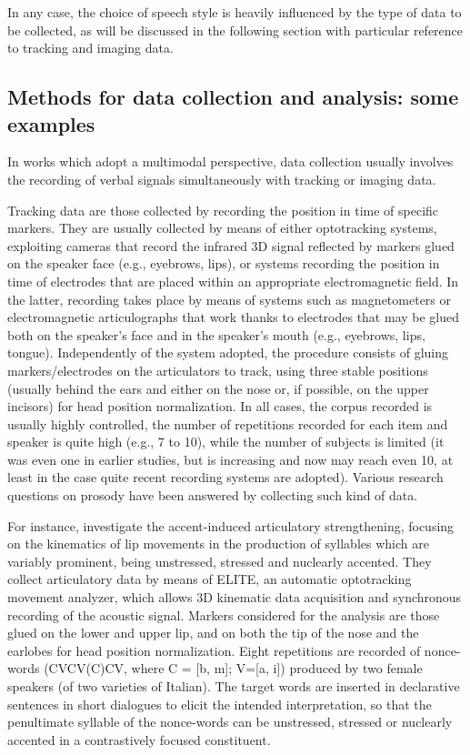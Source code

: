 \documentclass[output=paper]{langsci/langscibook}
\begin{document}
In any case, the choice of speech style is heavily influenced by the type of data to be collected, as  will be discussed in the following section with particular reference to tracking and imaging data.


 
\subsection{Methods for data collection and analysis: some examples} \label{sec:gil:2:2}


In works which adopt a multimodal perspective, data collection usually involves the recording of verbal signals simultaneously with tracking or imaging data. 

Tracking data are those collected by recording the position in time of specific markers. They are usually collected by means of either optotracking systems, exploiting cameras that record the infrared 3D signal reflected by markers glued on the speaker face (e.g., eyebrows, lips), or systems recording the position in time of electrodes that are placed within an appropriate electromagnetic field. In the latter, recording takes place by means of systems such as magnetometers or electromagnetic articulographs that work thanks to electrodes that may be glued both on the speaker’s face and in the speaker’s mouth (e.g., eyebrows, lips, tongue). Independently of the system adopted, the procedure consists of gluing markers\slash electrodes on the articulators to track, using three stable positions (usually behind the ears and either on the nose or, if possible, on the upper incisors) for head position normalization. In all cases, the corpus recorded is usually highly controlled, the number of repetitions recorded for each item and speaker is quite high (e.g., 7 to 10), while the number of subjects is limited (it was even one in earlier studies, but is increasing and now may reach even 10, at least in the case quite recent recording systems are adopted). Various research questions on prosody have been answered by collecting such kind of data. 

For instance, \citet{Avesani2007,Avesani2009} investigate the accent-induced articulatory strengthening, focusing on the kinematics of lip movements in the production of syllables which are variably prominent, being unstressed, stressed and nuclearly accented. They collect articulatory data by means of ELITE, an automatic optotracking movement analyzer, which allows 3D kinematic data acquisition and synchronous recording of the acoustic signal. Markers considered for the analysis are those glued on the lower and upper lip, and on both the tip of the nose and the earlobes for head position normalization. Eight repetitions are recorded of nonce-words (CVCV(C)CV, where C = [b, m]; V=[a, i]) produced by two female speakers (of two varieties of Italian). The target words are inserted in declarative sentences in short dialogues to elicit the intended interpretation, so that the penultimate syllable of the nonce-words can be unstressed, stressed or nuclearly accented in a contrastively focused constituent.
\end{document}
